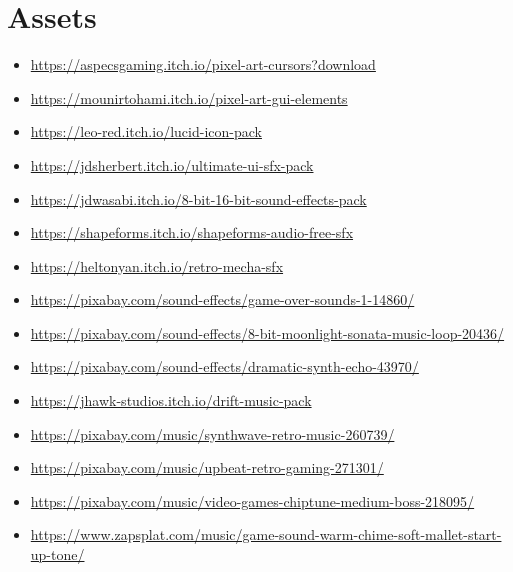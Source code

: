 \nocite{*}



\section*{Assets}
\begin{itemize}
\item \url{https://aspecsgaming.itch.io/pixel-art-cursors?download}
\item \url{https://mounirtohami.itch.io/pixel-art-gui-elements}
\item \url{https://leo-red.itch.io/lucid-icon-pack}
\item \url{https://jdsherbert.itch.io/ultimate-ui-sfx-pack}
\item \url{https://jdwasabi.itch.io/8-bit-16-bit-sound-effects-pack}
\item \url{https://shapeforms.itch.io/shapeforms-audio-free-sfx}
\item \url{https://heltonyan.itch.io/retro-mecha-sfx}
\item \url{https://pixabay.com/sound-effects/game-over-sounds-1-14860/}
\item \url{https://pixabay.com/sound-effects/8-bit-moonlight-sonata-music-loop-20436/}
\item \url{https://pixabay.com/sound-effects/dramatic-synth-echo-43970/}
\item \url{https://jhawk-studios.itch.io/drift-music-pack}
\item \url{https://pixabay.com/music/synthwave-retro-music-260739/}
\item \url{https://pixabay.com/music/upbeat-retro-gaming-271301/}
\item \url{https://pixabay.com/music/video-games-chiptune-medium-boss-218095/}
\item \url{https://www.zapsplat.com/music/game-sound-warm-chime-soft-mallet-start-up-tone/}
\end{itemize}